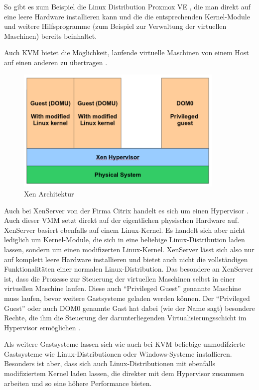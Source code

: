 So gibt es zum Beispiel die Linux Distribution Proxmox VE \citep[Vgl.][]{Proxmox14}, die man direkt auf eine leere Hardware installieren kann und die die entsprechenden Kernel-Module und weitere Hilfsprogramme (zum Beispiel zur Verwaltung der virtuellen Maschinen) bereits beinhaltet.

Auch KVM bietet die Möglichkeit, laufende virtuelle Maschinen von einem Host auf einen anderen zu übertragen \citep[Vgl.][]{kvm:001}.

\begin{figure}[!ht]
  \begin{center}
    \includegraphics[width=10cm]{bilder/xen.png}
    \caption{Xen Architektur \citep{kvm:002}}
  \end{center}
\end{figure}

Auch bei XenServer von der Firma Citrix handelt es sich um einen Hypervisor \citep[Vgl.][]{xen:001}. Auch dieser \ac{VMM} setzt direkt auf der eigentlichen physischen Hardware auf. XenServer basiert ebenfalls auf einem Linux-Kernel. Es handelt sich aber nicht lediglich um Kernel-Module, die sich in eine beliebige Linux-Distribution laden lassen, sondern um einen modifizerten Linux-Kernel. XenServer lässt sich also nur auf komplett leere Hardware installieren und bietet auch nicht die vollständigen Funktionalitäten einer normalen Linux-Distribution. Das besondere an XenServer ist, dass die Prozesse zur Steuerung der virtuellen Maschinen selbst in einer virtuellen Maschine laufen. Diese auch "`Privileged Guest"' genannte Maschine muss laufen, bevor weitere Gastsysteme geladen werden können. Der "`Privileged Guest"' oder auch DOM0 genannte Gast hat dabei (wie der Name sagt) besondere Rechte, die ihm die Steuerung der darunterliegenden Virtualisierungsschicht im Hypervisor ermöglichen \citep[Vgl.][S. 2]{Schee14}.

Als weitere Gastsysteme lassen sich wie auch bei KVM beliebige unmodifzierte Gastsysteme wie Linux-Distributionen oder Windows-Systeme installieren. Besonders ist aber, dass sich auch Linux-Distributionen mit ebenfalls modifiziertem Kernel laden lassen, die direkter mit dem Hypervisor zusammen arbeiten und so eine höhere Performance bieten.

